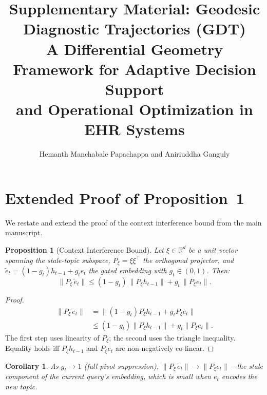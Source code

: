 \documentclass[journal,compsoc]{IEEEtran}
\newtheorem{proposition}{Proposition}
\newtheorem{corollary}{Corollary}
\begin{document}
\title{Supplementary Material: Geodesic Diagnostic Trajectories (GDT)\\
A Differential Geometry Framework for Adaptive Decision Support\\
and Operational Optimization in EHR Systems}

\author{Hemanth Manchabale Papachappa and Aniriuddha Ganguly}

\maketitle

\tableofcontents

\section{Extended Proof of Proposition~1}
\label{sec:proof}

We restate and extend the proof of the context interference bound from the
main manuscript.

\begin{proposition}[Context Interference Bound]
Let $\xi \in \mathbb{R}^d$ be a unit vector spanning the stale-topic subspace,
$P_\xi = \xi\xi^\top$ the orthogonal projector, and $\tilde{e}_t =
(1-g_t)h_{t-1} + g_t e_t$ the gated embedding with $g_t \in (0,1)$. Then:
\begin{equation}
  \|P_\xi\,\tilde{e}_t\| \leq (1-g_t)\,\|P_\xi h_{t-1}\| + g_t\,\|P_\xi e_t\|.
  \label{eq:bound}
\end{equation}
\end{proposition}

\begin{proof}
\begin{align}
  \|P_\xi\,\tilde{e}_t\|
  &= \|(1-g_t)P_\xi h_{t-1} + g_t P_\xi e_t\| \nonumber \\
  &\leq (1-g_t)\|P_\xi h_{t-1}\| + g_t\|P_\xi e_t\|.
\end{align}
The first step uses linearity of $P_\xi$; the second uses the triangle
inequality. Equality holds iff $P_\xi h_{t-1}$ and $P_\xi e_t$ are non-negatively
co-linear.
\end{proof}

\begin{corollary}
As $g_t \to 1$ (full pivot suppression),
$\|P_\xi\,\tilde{e}_t\| \to \|P_\xi e_t\|$---the stale component of the
\emph{current} query's embedding, which is small when $e_t$ encodes the new topic.
\end{corollary}
\end{document}
